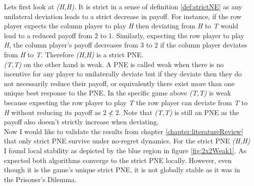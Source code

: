 Lets first look at \textit{(H,H)}. It is strict in a sense of definition \ref{def:strictNE} as any unilateral deviation leads to a strict decrease in payoff. For instance, if the row player expects the column player to play \textit{H} then deviating from \textit{H} to \textit{T} would lead to a reduced payoff from $2$ to $1$. Similarly, expecting the row player to play \textit{H}, the column player's payoff decreases from $3$ to $2$ if the column player deviates from \textit{H} to \textit{T}. Therefore \textit{(H,H)} is a strict PNE. \\

\textit{(T,T)} on the other hand is weak. A PNE is called weak when there is no incentive for any player to unilaterally deviate but if they deviate then they do not necessarily reduce their payoff, or equivalently there exist more than one unique best response to the PNE. In the specific game above \textit{(T,T)} is weak because expecting the row player to play \textit{T} the row player can deviate from \textit{T} to \textit{H} without reducing its payoff as $2 \nless 2$. Note that \textit{(T,T)} is still an PNE as the payoff also doesn't strictly increase when deviating. \\

Now I would like to validate the results from chapter \ref{chapter:literatureReview} that only strict PNE survive under no-regret dynamics. For the strict PNE \textit{(H,H)} I found local stability as depicted by the blue region in figure \ref{fig:2x2Weak1}. As expected both algorithms converge to the strict PNE locally. However, even though it is the game's unique strict PNE, it is not globally stable as it was in the Prisoner's Dilemma. 

